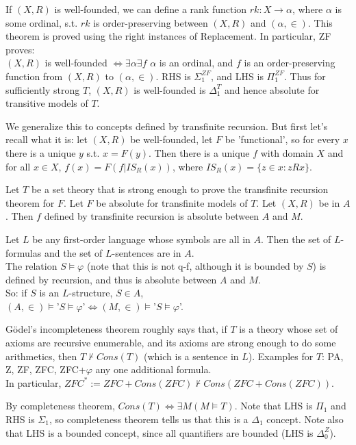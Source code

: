 \documentclass[a4paper]{article}
\begin{document}
If $(X,R)$ is well-founded, we can define a rank function $rk:X \to \alpha$, where $\alpha$ is some ordinal, s.t. $rk$ is order-preserving between $(X,R)$ and $(\alpha,\in)$. This theorem is proved using the right instances of Replacement. In particular, ZF proves:\\
$(X,R)$ is well-founded $\iff \exists \alpha \exists f$ $\alpha$ is an ordinal, and $f$ is an order-preserving function from $(X,R)$ to $(\alpha,\in)$. RHS is $\Sigma_1^{ZF}$, and LHS is $\Pi_1^{ZF}$. Thus for sufficiently strong $T$, $(X,R)$ is well-founded is $\Delta_1^T$ and hence absolute for transitive models of $T$.

We generalize this to concepts defined by transfinite recursion. But first let's recall what it is: let $(X,R)$ be well-founded, let $F$ be 'functional', so for every $x$ there is a unique $y$ s.t. $x=F(y)$. Then there is a unique $f$ with domain $X$ and for all $x \in X$, $f(x) = F(f|IS_R(x))$, where $IS_R(x) = \{z \in x: z R x\}$.

\begin{prop}
Let $T$ be a set theory that is strong enough to prove the transfinite recursion theorem for $F$. Let $F$ be absolute for transfinite models of $T$. Let $(X,R)$ be in $A$. Then $f$ defined by transfinite recursion is absolute between $A$ and $M$.
\end{prop}

\begin{eg}
Let $L$ be any first-order language whose symbols are all in $A$. Then the set of $L$-formulas and the set of $L$-sentences are in $A$.\\
The relation $S \vDash \varphi$ (note that this is not q-f, although it is bounded by $S$) is defined by recursion, and thus is absolute between $A$ and $M$.\\
So: if $S$ is an $L$-structure, $S \in A$,\\
$(A,\in) \vDash $'$S \vDash \varphi$'$ \iff (M,\in) \vDash $'$S \vDash \varphi$'.
\end{eg}

G\"{o}del's incompleteness theorem roughly says that, if $T$ is a theory whose set of axioms are recursive enumerable, and its axioms are strong enough to do some arithmetics, then $T \not\vdash Cons(T)$ (which is a sentence in $L$). Examples for $T$: PA, Z, ZF, ZFC, ZFC+$\varphi$ any one additional formula.\\
In particular, $ZFC^* := ZFC + Cons(ZFC) \not\vdash Cons(ZFC+Cons(ZFC))$.

By completeness theorem, $Cons(T) \iff \exists M (M \vDash T)$. Note that LHS is $\Pi_1$ and RHS is $\Sigma_1$, so completeness theorem tells us that this is a $\Delta_1$ concept. Note also that LHS is a bounded concept, since all quantifiers are bounded (LHS is $\Delta_0^Z$).
\end{document}
